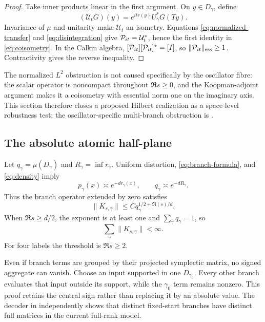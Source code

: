 \begin{proof}
Take inner products linear in the first argument.  On \(y\in D_\gamma\),
define
\[
 (\mathcal U_tG)(y)=e^{itr(y)}U_\gamma^*G(Ty).
\]
Invariance of \(\mu\) and unitarity make \(\mathcal U_t\) an isometry.
Equations \eqref{eq:normalized-transfer} and \eqref{eq:disintegration} give
\(\mathcal P_{it}=\mathcal U_t^*\), hence the first identity in
\eqref{eq:coisometry}.  In the Calkin algebra,
\([\mathcal P_{it}][\mathcal P_{it}]^*=[I]\), so
\(\|\mathcal P_{it}\|_{\mathrm{ess}}\ge1\).  Contractivity gives the reverse inequality.
\end{proof}

The normalized \(L^2\) obstruction is not caused specifically by the
oscillator fibre: the scalar operator is noncompact throughout
\(\Re s\ge0\), and the Koopman-adjoint argument makes it a coisometry with
essential norm one on the imaginary axis.  This section therefore closes a
proposed Hilbert realization as a space-level robustness test; the
oscillator-specific multi-branch obstruction is
.

\subsection{The absolute atomic half-plane}

Let \(q_\gamma=\mu(D_\gamma)\) and
\(R_\gamma=\inf r_\gamma\).  Uniform distortion,
\eqref{eq:branch-formula}, and \eqref{eq:density} imply
\begin{equation}
 p_\gamma(x)\asymp e^{-d r_\gamma(x)},
 \qquad
 q_\gamma\asymp e^{-dR_\gamma}.
 \label{eq:q-comparison}
\end{equation}
Thus the branch operator extended by zero satisfies
\begin{equation}
 \|K_{s,\gamma}\|
 \le Cq_\gamma^{1/2+\Re(s)/d}.
 \label{eq:atomic-bound}
\end{equation}
When \(\Re s\ge d/2\), the exponent is at least one and
\(\sum_\gamma q_\gamma=1\), so
\begin{equation}
 \sum_\gamma\|K_{s,\gamma}\|<\infty.
 \label{eq:atomic-sum}
\end{equation}
For four labels the threshold is \(\Re s\ge2\).

Even if branch terms are grouped by their projected symplectic matrix, no
signed aggregate can vanish.  Choose an input supported in one
\(D_{\gamma_0}\).  Every other branch evaluates that input outside its
support, while the \(\gamma_0\) term remains nonzero.  This proof retains the
central sign rather than replacing it by an absolute value.  The decoder in
 independently shows that distinct fixed-start branches
have distinct full matrices in the current full-rank model.
